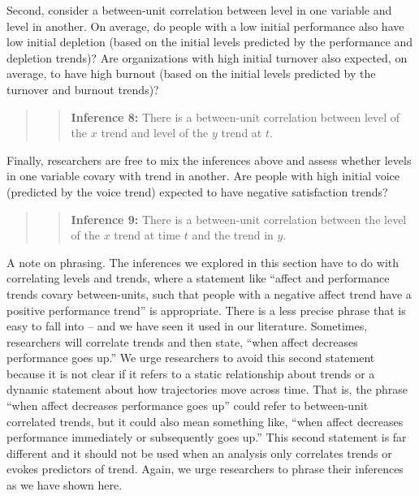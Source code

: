 \documentclass[english,,man]{apa6}
\theoremstyle{definition}
\theoremstyle{definition}
\theoremstyle{definition}
\theoremstyle{remark}
\begin{document}
Second, consider a between-unit correlation between level in one
variable and level in another. On average, do people with a low initial
performance also have low initial depletion (based on the initial levels
predicted by the performance and depletion trends)? Are organizations
with high initial turnover also expected, on average, to have high
burnout (based on the initial levels predicted by the turnover and
burnout trends)?

\begin{quote}
\begin{quote}
\textbf{Inference 8:} There is a between-unit correlation between level
of the \(x\) trend and level of the \(y\) trend at \(t\).
\end{quote}
\end{quote}

Finally, researchers are free to mix the inferences above and assess
whether levels in one variable covary with trend in another. Are people
with high initial voice (predicted by the voice trend) expected to have
negative satisfaction trends?

\begin{quote}
\begin{quote}
\textbf{Inference 9:} There is a between-unit correlation between the
level of the \(x\) trend at time \(t\) and the trend in \(y\).
\end{quote}
\end{quote}

A note on phrasing. The inferences we explored in this section have to
do with correlating levels and trends, where a statement like
\enquote{affect and performance trends covary between-units, such that
people with a negative affect trend have a positive performance trend}
is appropriate. There is a less precise phrase that is easy to fall into
-- and we have seen it used in our literature. Sometimes, researchers
will correlate trends and then state, \enquote{when affect decreases
performance goes up.} We urge researchers to avoid this second statement
because it is not clear if it refers to a static relationship about
trends or a dynamic statement about how trajectories move across time.
That is, the phrase \enquote{when affect decreases performance goes up}
could refer to between-unit correlated trends, but it could also mean
something like, \enquote{when affect decreases performance immediately
or subsequently goes up.} This second statement is far different and it
should not be used when an analysis only correlates trends or evokes
predictors of trend. Again, we urge researchers to phrase their
inferences as we have shown here.
\end{document}
